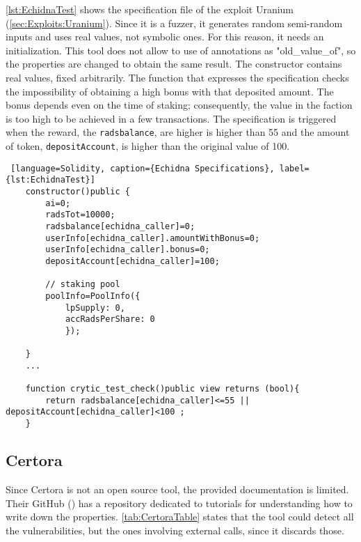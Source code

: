 \autoref{lst:EchidnaTest} shows the specification file of the exploit Uranium (\autoref*{sec:Exploits:Uranium}).
Since it is a fuzzer, it generates random semi-random inputs and uses real values, not symbolic ones.
For this reason, it needs an initialization.
This tool does not allow to use of annotations as "old\_value\_of", so the properties are changed to obtain the same result.
The constructor contains real values, fixed arbitrarily.
The function that expresses the specification checks the impossibility of obtaining a high bonus with that deposited amount.
The bonus depends even on the time of staking; consequently, the value in the faction is too high to be achieved in a few transactions.
The specification is triggered when the reward, the \texttt{radsbalance}, are higher is higher than 55 and the amount of token, \texttt{depositAccount},
is higher than the original value of 100.

\begin{lstlisting} [language=Solidity, caption={Echidna Specifications}, label={lst:EchidnaTest}]
    constructor()public {
        ai=0;
        radsTot=10000;
        radsbalance[echidna_caller]=0;
        userInfo[echidna_caller].amountWithBonus=0;
        userInfo[echidna_caller].bonus=0;
        depositAccount[echidna_caller]=100;
        
        // staking pool
        poolInfo=PoolInfo({
            lpSupply: 0,
            accRadsPerShare: 0
            });

    }
    ...
   
    function crytic_test_check()public view returns (bool){
        return radsbalance[echidna_caller]<=55 || depositAccount[echidna_caller]<100 ;
    }
\end{lstlisting} 

\subsection*{Certora} Since Certora is not an open source tool, the provided documentation is limited. 
Their GitHub (\cite{CertoraGitHub}) has a repository dedicated to tutorials for understanding how to write down the properties. 
\autoref{tab:CertoraTable} states that the tool could detect all the vulnerabilities, 
but the ones involving external calls, since it discards those.

